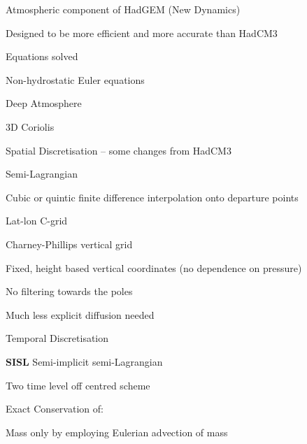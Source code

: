 \begin{slide}{Atmospheric component of HadGEM (New Dynamics)}

\begin{list0}

\item Designed to be more efficient and more accurate than HadCM3

\item Equations solved
\begin{list1}
\item Non-hydrostatic Euler equations
\item Deep Atmosphere
\item 3D Coriolis
\end{list1}

\item Spatial Discretisation -- some changes from HadCM3
\begin{list1}
\item Semi-Lagrangian
\item Cubic or quintic finite difference interpolation onto departure points
\item Lat-lon C-grid
\item Charney-Phillips vertical grid
\item Fixed, height based vertical coordinates (no dependence on pressure)
\item No filtering towards the poles
\item Much less explicit diffusion needed
\end{list1}

\item Temporal Discretisation
\begin{list1}
\item {\color{purple}\bf SISL} Semi-implicit semi-Lagrangian
\item Two time level off centred scheme
\end{list1}

\item Exact Conservation of:
\begin{list1}
\item Mass only by employing Eulerian advection of mass
\end{list1}

\end{list0}

\end{slide}

